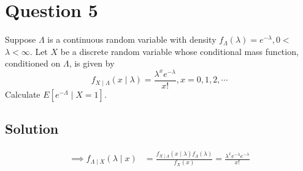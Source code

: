 \section*{Question 5}

Suppose \( \Lambda \) is a continuous random variable with density \( f_{\Lambda}(\lambda)=e^{-\lambda}, 0< \) \( \lambda<\infty \).
Let \( X \) be a discrete random variable whose conditional mass function, conditioned on \( \Lambda \), is given by
\[
    f_{X \mid \Lambda}(x \mid \lambda)=\frac{\lambda^{x} e^{-\lambda}}{x!}, x=0,1,2, \cdots
\]
Calculate \( E\left[e^{-\Lambda} \mid X=1\right] \).

\subsection*{Solution}

\begin{align*}
    \implies
    f_{\Lambda \mid X}(\lambda \mid x)
     & =
    \frac{f_{X \mid \Lambda}(x \mid \lambda) f_{\Lambda}(\lambda)}{f_{X}(x)}
    =
    \frac{\lambda^{x} e^{-\lambda} e^{-\lambda}}{x!}
\end{align*}
